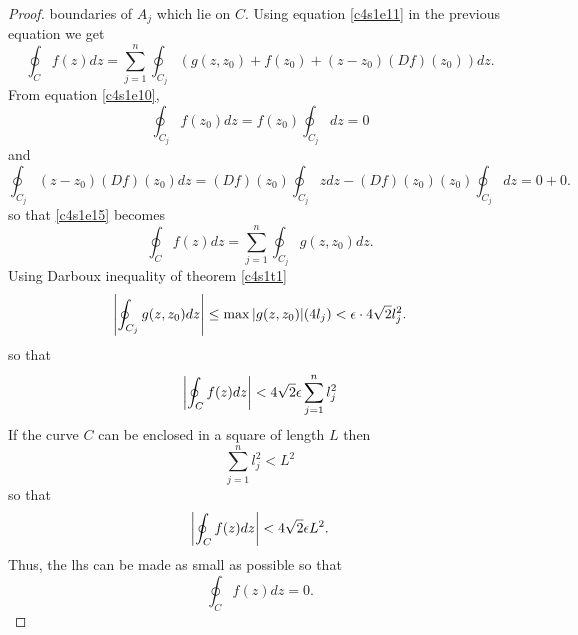 \begin{proof}
boundaries of $A_j$ which lie on $C$. Using equation \eqref{c4s1e11} in the
previous equation we get
\begin{equation}\label{c4s1e15}
\oint_C f(z)dz = \sum_{j=1}^n \oint_{C_j}\left(g(z,z_0) + f(z_0) + (z - z_0)
(Df)(z_0)\right)dz.
\end{equation}
From equation \eqref{c4s1e10},
\[
\oint_{C_j}f(z_0)dz = f(z_0)\oint_{C_j}dz = 0
\]
and
\[
\oint_{C_j}(z - z_0)(Df)(z_0)dz = (Df)(z_0)\oint_{C_j}zdz - (Df)(z_0)(z_0)
\oint_{C_j}dz = 0 + 0.
\]
so that \eqref{c4s1e15} becomes
\begin{equation}\label{c4s1e16}
\oint_C f(z)dz = \sum_{j=1}^n \oint_{C_j}g(z,z_0)dz.
\end{equation}
Using Darboux inequality of theorem \ref{c4s1t1}
\[
\left\vert{\oint_{C_j} g(z,z_0)dz}\right\vert \le \max{\left\vert{g(z,z_0)}\right\vert}(4l_j) < \epsilon \cdot
4\sqrt{2}l_j^2.
\]
so that
\[
\left\vert{\oint_C f(z)dz}\right\vert < 4\sqrt{2}\epsilon \sum_{j=1}^n l_j^2
\]
If the curve $C$ can be enclosed in a square of length $L$ then
\[
\sum_{j=1}^n l_j^2 < L^2
\] 
so that
\[
\left\vert{\oint_C f(z)dz}\right\vert < 4\sqrt{2}\epsilon L^2.
\]
Thus, the lhs can be made as small as possible so that
\[
\oint_C f(z)dz = 0.
\]
\end{proof}

